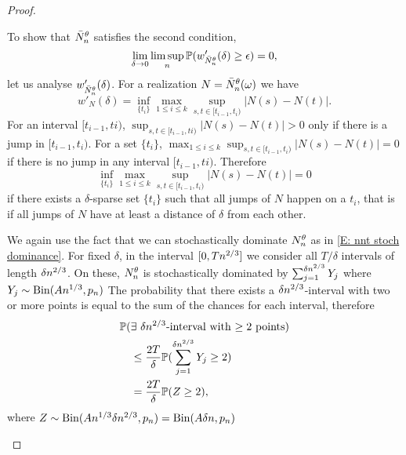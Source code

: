 \begin{proof}
\begin{proofpart}
To show that $\bar{N}_n^{\theta}$ satisfies the second condition,
\begin{equation} \label{E: tightness cond 2}
\lim_{\delta \rightarrow 0} \limsup_n \mathbb{P}(w'_{\bar{N}_n^{\theta}}(\delta) \geq \epsilon ) = 0,
\end{equation}
let us analyse $w'_{\bar{N}_n^{\theta}}(\delta)$.
For a realization $N = \bar{N}_n^{\theta}(\omega)$ we have
\begin{equation}
w'_{N}(\delta) = \inf_{\{t_i\}} \max_{1\leq i \leq k} \sup_{s,t \in [t_{i-1}, t_i)} |N(s) - N(t)|.
\end{equation}
For an interval $[t_{i-1}, ti)$, 
$\sup_{s,t \in [t_{i-1}, ti)} |N(s) - N(t)| > 0$ only if there is a jump in $[t_{i-1}, t_i)$.
For a set $\{t_i\}$, $\max_{1\leq i \leq k} \sup_{s,t \in [t_{i-1}, t_i)} |N(s) - N(t)| = 0$ if there is no jump in any interval $[t_{i-1}, ti)$.
Therefore
\begin{equation}
\inf_{\{t_i\}} \max_{1\leq i \leq k} \sup_{s,t \in [t_{i-1}, t_i)} |N(s) - N(t)| = 0
\end{equation}
if there exists a $\delta$-sparse set $\{t_i\}$ such that all jumps of $N$ happen on a $t_i$,
that is if all jumps of $N$ have at least a distance of $\delta$ from each other.

We again use the fact that we can stochastically dominate $N_n^{\theta}$ as in \eqref{E: nnt stoch dominance}.
For fixed $\delta$, in the interval $[0, Tn^{2 / 3}]$ we consider all $T/\delta$ intervals of length $\delta n^{2 / 3}$.
On these, $N_n^{\theta}$ is stochastically dominated by $\sum_{j = 1}^{\delta n^{2 / 3}} Y_j$ where $Y_j \sim \operatorname*{Bin}(An^{1 / 3}, p_n)$
The probability that there exists a $\delta n^{2 / 3}$-interval with two or more points is equal to the sum of the chances for each interval,
therefore
\begin{equation}
\begin{aligned}
&\mathbb{P}( \text{$\exists$ $\delta n^{2 / 3}$-interval with $\geq 2$ points} ) \\
&\quad\leq \frac{2T}{\delta} \mathbb{P}( \sum_{j = 1}^{\delta n^{2 / 3}} Y_j \geq 2 ) \\
&\quad=  \frac{2T}{\delta} \mathbb{P}( Z \geq 2 ),
\end{aligned}
\end{equation}
where $Z \sim \operatorname*{Bin}(An^{1 / 3}\delta n^{2 / 3}, p_n) = \operatorname*{Bin}(A\delta n, p_n)$


\end{proofpart}
\end{proof}
